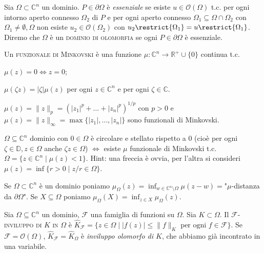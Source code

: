 \begin{defn}
  Sia $\Omega \subset \mathbb{C}^n$ un dominio. $P \in \partial \Omega$ è \textit{essenziale} se esiste $u \in \mathcal{O}(\Omega)$ t.c. per ogni intorno aperto connesso $\Omega_2$ di $P$ e per ogni aperto connesso $\Omega_1 \subseteq \Omega \cap \Omega_2$ con $\Omega_1\not=\emptyset,\Omega$ non esiste $u_2 \in \mathcal{O}(\Omega_2)$ con $u_2\restrict{\Omega_1}=u\restrict{\Omega_1}$.
  Diremo che $\Omega$ è un \textsc{dominio di olomorfia} se ogni $P \in \partial \Omega$ è essenziale.
\end{defn}

\begin{defn}
  Un \textsc{funzionale di Minkovski} è una funzione $\mu:\mathbb{C}^n \longrightarrow \mathbb{R}^+\cup\{0\}$ continua t.c.
  \begin{nlist}
    \item $\mu(z)=0 \iff z=0$;
    \item $\mu(\zeta z)=|\zeta|\mu(z)$ per ogni $z \in \mathbb{C}^n$ e per ogni $\zeta \in \mathbb{C}$.
  \end{nlist}
\end{defn}

\begin{ex}
  $\mu(z)=\|z\|_p=(|z_1|^p+\dots+|z_n|^p)^{1/p}$ con $p>0$ e $\mu(z)=\|z\|_{\infty}=\max\{|z_1|,\dots,|z_n|\}$ sono funzionali di Minkovski.
\end{ex}

\begin{exc}
  $\Omega \subseteq \mathbb{C}^n$ dominio con $0 \in \Omega$ è circolare e stellato rispetto a $0$ (cioè per ogni $\zeta \in \mathbb{D}, z \in \Omega$ anche $\zeta z \in \Omega$) $\iff$ esiste $\mu$ funzionale di Minkovski t.c. $\Omega=\{z \in \mathbb{C}^n \mid \mu(z)<1\}$. Hint: una freccia è ovvia, per l'altra si consideri $\mu(z)=\inf\{r>0 \mid z/r \in \Omega \}$.
\end{exc}

Se $\Omega \subset \mathbb{C}^n$ è un dominio poniamo $\displaystyle \mu_\Omega(z)=\inf_{w \in \mathbb{C}^n\setminus\Omega} \mu(z-w)=$"$\mu$-distanza da $\partial\Omega$". Se $X \subseteq \Omega$ poniamo $\displaystyle \mu_\Omega(X)=\inf_{z \in X} \mu_\Omega(z)$.

\begin{defn}
  Sia $\Omega \subseteq \mathbb{C}^n$ un dominio, $\mathcal{F}$ una famiglia di funzioni su $\Omega$. Sia $K \subset \Omega$. Il \textsc{$\mathcal{F}$-inviluppo di $K$ in $\Omega$} è $\hat{K}_{\mathcal{F}}=\{z \in \Omega \mid |f(z)| \le \|f\|_K \text{ per ogni } f \in \mathcal{F}\}$.
  Se $\mathcal{F}=\mathcal{O}(\Omega)$, $\hat{K}_{\mathcal{F}}=\hat{K}_{\Omega}$ è \textit{inviluppo olomorfo di $K$}, che abbiamo già incontrato in una variabile.
\end{defn}

